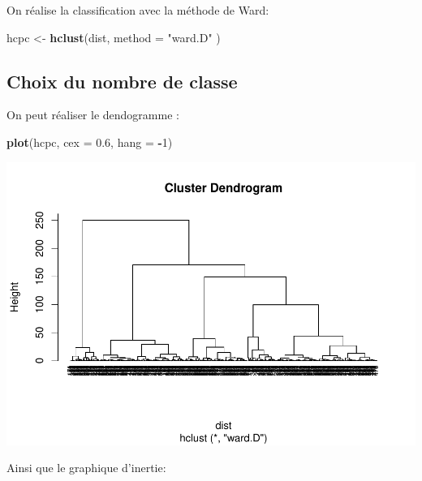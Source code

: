 \documentclass[
]{book}
\newenvironment{Shaded}{\begin{snugshade}}{\end{snugshade}}
\newcommand{\AttributeTok}[1]{\textcolor[rgb]{0.13,0.29,0.53}{#1}}
\newcommand{\ConstantTok}[1]{\textcolor[rgb]{0.56,0.35,0.01}{#1}}
\newcommand{\DecValTok}[1]{\textcolor[rgb]{0.00,0.00,0.81}{#1}}
\newcommand{\FloatTok}[1]{\textcolor[rgb]{0.00,0.00,0.81}{#1}}
\newcommand{\FunctionTok}[1]{\textcolor[rgb]{0.13,0.29,0.53}{\textbf{#1}}}
\newcommand{\NormalTok}[1]{#1}
\newcommand{\OtherTok}[1]{\textcolor[rgb]{0.56,0.35,0.01}{#1}}
\newcommand{\SpecialCharTok}[1]{\textcolor[rgb]{0.81,0.36,0.00}{\textbf{#1}}}
\newcommand{\StringTok}[1]{\textcolor[rgb]{0.31,0.60,0.02}{#1}}
\begin{document}
On réalise la classification avec la méthode de Ward:

\begin{Shaded}
\begin{Highlighting}[]
\NormalTok{hcpc }\OtherTok{\textless{}{-}} \FunctionTok{hclust}\NormalTok{(dist, }\AttributeTok{method =} \StringTok{"ward.D"}\NormalTok{ )}
\end{Highlighting}
\end{Shaded}

\hypertarget{choix-du-nombre-de-classe}{%
\subsection{Choix du nombre de classe}\label{choix-du-nombre-de-classe}}

On peut réaliser le dendogramme :

\begin{Shaded}
\begin{Highlighting}[]
\FunctionTok{plot}\NormalTok{(hcpc, }\AttributeTok{cex =} \FloatTok{0.6}\NormalTok{, }\AttributeTok{hang =} \SpecialCharTok{{-}}\DecValTok{1}\NormalTok{)}
\end{Highlighting}
\end{Shaded}

\includegraphics{manuel_geo_quanti_files/figure-latex/unnamed-chunk-95-1.pdf}

Ainsi que le graphique d'inertie:

\begin{Shaded}
\end{Shaded}
\end{document}
